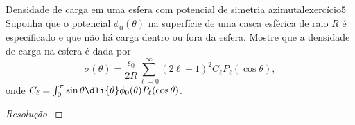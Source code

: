 \begin{exercício}{Densidade de carga em uma esfera com potencial de simetria azimutal}{exercício5}
   Suponha que o potencial \(\phi_0(\theta)\) na superfície de uma casca esférica de raio \(R\) é especificado e que não há carga dentro ou fora da esfera. Mostre que a densidade de carga na esfera é dada por
   \begin{equation*}
       \sigma(\theta) = \frac{\epsilon_0}{2R}\sum_{\ell = 0}^\infty (2\ell + 1)^2 C_\ell P_\ell(\cos\theta),
   \end{equation*}
   onde \(C_\ell = \int_{0}^\pi \sin\theta\dli{\theta}\phi_0(\theta)P_\ell(\cos\theta)\).
\end{exercício}
\begin{proof}[Resolução]

\end{proof}
